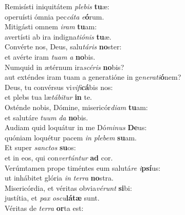 \evenverse Remisísti iniquitátem \textit{ple}\textit{bis} \textbf{tu}æ:~\*\\
\evenverse operuísti ómnia pec\textit{cá}\textit{ta} \textit{e}\textbf{ó}rum.\\
\oddverse Mitigásti omnem \textit{i}\textit{ram} \textbf{tu}am:~\*\\
\oddverse avertísti ab ira indigna\textit{ti}\textit{ó}\textit{nis} \textbf{tu}æ.\\
\evenverse Convérte nos, Deus, salu\textit{tá}\textit{ris} \textbf{no}ster:~\*\\
\evenverse et avérte iram \textit{tu}\textit{am} \textit{a} \textbf{no}bis.\\
\oddverse Numquid in ætérnum ira\textit{scé}\textit{ris} \textbf{no}bis?~\*\\
\oddverse aut exténdes iram tuam a generatióne in ge\textit{ne}\textit{ra}\textit{ti}\textbf{ó}nem?\\
\evenverse Deus, tu convérsus vi\textit{vi}\textit{fi}\textbf{cá}bis nos:~\*\\
\evenverse et plebs tua læ\textit{tá}\textit{bi}\textit{tur} \textbf{in} te.\\
\oddverse Osténde nobis, Dómine, misericór\textit{di}\textit{am} \textbf{tu}am:~\*\\
\oddverse et salutáre \textit{tu}\textit{um} \textit{da} \textbf{no}bis.\\
\evenverse Audiam quid loquátur in me Dó\textit{mi}\textit{nus} \textbf{De}us:~\*\\
\evenverse quóniam loquétur pacem \textit{in} \textit{ple}\textit{bem} \textbf{su}am.\\
\oddverse Et super \textit{san}\textit{ctos} \textbf{su}os:~\*\\
\oddverse et in eos, qui con\textit{ver}\textit{tún}\textit{tur} \textbf{ad} cor.\\
\evenverse Verúmtamen prope timéntes eum salutá\textit{re} \textit{i}\textbf{psí}us:~\*\\
\evenverse ut inhábitet glória \textit{in} \textit{ter}\textit{ra} \textbf{no}stra.\\
\oddverse Misericórdia, et véritas obvia\textit{vé}\textit{runt} \textbf{si}bi:~\*\\
\oddverse justítia, et \textit{pax} \textit{o}\textit{scu}\textbf{lá}\textbf{tæ} sunt.\\
\evenverse Véritas de \textit{ter}\textit{ra} \textbf{or}ta est:~\*\\
